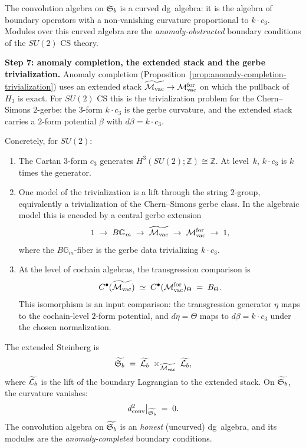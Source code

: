 \begin{construction}
The convolution algebra on $\mathfrak{S}_b$ is a curved dg~algebra: it is the
algebra of boundary operators with a non-vanishing curvature
proportional to $k\cdot c_3$. Modules over this curved algebra are
the \emph{anomaly-obstructed} boundary conditions of the $SU(2)$ CS
theory.

\medskip
\noindent\textbf{Step 7: anomaly completion, the extended stack
and the gerbe trivialization.}
Anomaly completion (Proposition~\ref{prop:anomaly-completion-trivialization})
uses an extended stack \(\widetilde{\mathcal{M}_{\mathrm{vac}}}\to\mathcal{M}_{\mathrm{vac}}^{\mathrm{for}}\)
on which the pullback of \(H_3\) is exact. For \(SU(2)\) CS this is
the trivialization problem for the Chern--Simons \(2\)-gerbe:
the \(3\)-form \(k\cdot c_3\) is the gerbe curvature, and the
extended stack carries a \(2\)-form potential \(\beta\) with
\(d\beta=k\cdot c_3\).

Concretely, for $SU(2)$:
\begin{enumerate}[label=\textup{(\roman*)}]
\item The Cartan $3$-form $c_3$ generates
 $H^3(SU(2);\mathbb Z)\cong\mathbb Z$. At level~$k$,
 $k\cdot c_3$ is $k$ times the generator.
\item One model of the trivialization is a lift through the
 string \(2\)-group, equivalently a trivialization of the
 Chern--Simons gerbe class. In the algebraic model this is encoded by
 a central gerbe extension
 \[
 1 \;\to\; B\mathbb G_m \;\to\;
 \widetilde{\mathcal{M}_{\mathrm{vac}}} \;\to\; \mathcal{M}_{\mathrm{vac}}^{\mathrm{for}} \;\to\; 1,
 \]
 where the $B\mathbb G_m$-fiber is the gerbe data trivializing
 $k\cdot c_3$.
\item At the level of cochain algebras, the transgression comparison is
 \begin{equation}\label{eq:su2-transgression-match}
 C^\bullet(\widetilde{\mathcal{M}_{\mathrm{vac}}})
 \;\simeq\;
 C^\bullet(\mathcal{M}_{\mathrm{vac}}^{\mathrm{for}})_\Theta
 \;=\;
 B_\Theta.
 \end{equation}
 This isomorphism is an input comparison: the transgression generator
 \(\eta\) maps to the cochain-level \(2\)-form potential, and
 \(d\eta=\Theta\) maps to \(d\beta=k\cdot c_3\) under the chosen
 normalization.
\end{enumerate}

The extended Steinberg is
\begin{equation}\label{eq:su2-extended-steinberg}
\widetilde{\mathfrak{S}_b}
\;=\;
\widetilde{\mathcal{L}_b}
\;\times_{\widetilde{\mathcal{M}_{\mathrm{vac}}}}\;
\widetilde{\mathcal{L}_b},
\end{equation}
where $\widetilde{\mathcal{L}_b}$ is the lift of the boundary Lagrangian to the
extended stack. On $\widetilde{\mathfrak{S}_b}$, the curvature vanishes:
\[
d^2_{\mathrm{conv}}\big|_{\widetilde{\mathfrak{S}_b}} \;=\; 0.
\]
The convolution algebra on $\widetilde{\mathfrak{S}_b}$ is an \emph{honest}
(uncurved) dg~algebra, and its modules are the
\emph{anomaly-completed} boundary conditions.


\end{construction}
